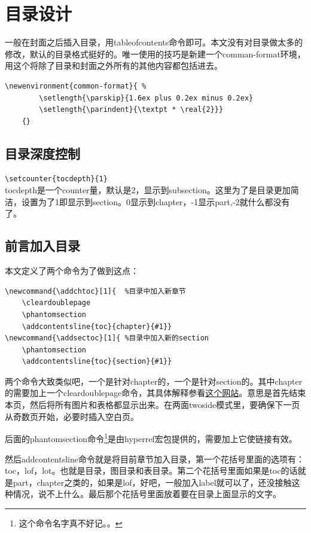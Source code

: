 \documentclass[11pt,oneside]{book}
\begin{document}
\chapter{目录设计}
一般在封面之后插入目录，用tableofcontents命令即可。本文没有对目录做太多的修改，默认的目录格式挺好的。唯一使用的技巧是新建一个comman-format环境，用这个将除了目录和封面之外所有的其他内容都包括进去。
\begin{Verbatim}
\newenvironment{common-format}{ %
        \setlength{\parskip}{1.6ex plus 0.2ex minus 0.2ex}  
        \setlength{\parindent}{\textpt * \real{2}}}
    {}
\end{Verbatim}

\section{目录深度控制}
\verb+\setcounter{tocdepth}{1} +\\
tocdepth是一个counter量，默认是2，显示到subsection。这里为了是目录更加简洁，设置为了1即显示到section。0显示到chapter，-1显示part,-2就什么都没有了。

\section{前言加入目录}
\label{sec:前言加入目录}
本文定义了两个命令为了做到这点：
\begin{Verbatim}
\newcommand{\addchtoc}[1]{  %目录中加入新章节
	\cleardoublepage   
	\phantomsection    
	\addcontentsline{toc}{chapter}{#1}}
\newcommand{\addsectoc}[1]{ %目录中加入新的section
	\phantomsection    
	\addcontentsline{toc}{section}{#1}}	
\end{Verbatim}
两个命令大致类似吧，一个是针对chapter的，一个是针对section的。其中chapter的需要加上一个cleardoublepage命令，其具体解释参看\href{http://www.personal.ceu.hu/tex/breaking.htm#clrdblpage}{这个网站}。意思是首先结束本页，然后将所有图片和表格都显示出来。在两面twoside模式里，要确保下一页从奇数页开始，必要时插入空白页。

后面的phantomsection命令\footnote{这个命令名字真不好记。。}是由hyperref宏包提供的，需要加上它使链接有效。     

然后addcontentsline命令就是将目前章节加入目录，第一个花括号里面的选项有：toc，lof，lot。也就是目录，图目录和表目录。第二个花括号里面如果是toc的话就是part，chapter之类的，如果是lof，好吧，一般加入label就可以了，还没接触这种情况，说不上什么。最后那个花括号里面放着要在目录上面显示的文字。
\end{document}
